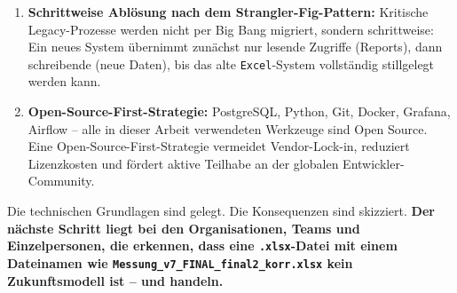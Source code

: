 ﻿\documentclass[12pt,a4paper]{report}
\theoremstyle{definition}
\theoremstyle{remark}
\newcommand{\excel}{\texttt{Excel}}
\newcommand{\code}[1]{\texttt{#1}}
\begin{document}
\begin{enumerate}[leftmargin=1.5em, itemsep=5pt]
  \item \textbf{Schrittweise Ablösung nach dem Strangler-Fig-Pattern:}
        Kritische Legacy-Prozesse werden nicht per Big Bang migriert,
        sondern schrittweise: Ein neues System übernimmt zunächst nur
        lesende Zugriffe (Reports), dann schreibende (neue Daten),
        bis das alte \excel-System vollständig stillgelegt werden kann.

  \item \textbf{Open-Source-First-Strategie:}
        PostgreSQL, Python, Git, Docker, Grafana, Airflow --
        alle in dieser Arbeit verwendeten Werkzeuge sind Open Source.
        Eine Open-Source-First-Strategie vermeidet Vendor-Lock-in,
        reduziert Lizenzkosten und fördert aktive Teilhabe an der
        globalen Entwickler-Community.
\end{enumerate}

Die technischen Grundlagen sind gelegt. Die Konsequenzen sind skizziert.
\textbf{Der nächste Schritt liegt bei den Organisationen, Teams und
Einzelpersonen, die erkennen, dass eine \code{.xlsx}-Datei mit einem
Dateinamen wie \code{Messung\_v7\_FINAL\_final2\_korr\newline .xlsx} kein
Zukunftsmodell ist -- und handeln.}
\end{document}
